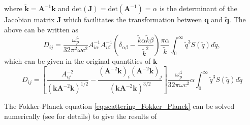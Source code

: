 where $\widetilde{\mathbf{k}} = \mathbf{A}^{-1} \mathbf{k}$ and $\mbox{det}(\mathbf{J}) =\mbox{det}(\mathbf{A}^{-1}) = \alpha$ is the determinant of the Jacobian matrix $\mathbf{J}$ which facilitates the transformation between $\mathbf{q}$ and $\widetilde{\mathbf{q}}$. The above can be written as
\begin{equation}
D_{ij} = \frac{\omega_p^4}{32 \pi^2 \omega c^2} A_{i\alpha}^{-1} A_{i \beta}^{-1} \left(\delta_{\alpha \beta} - \frac{\widetilde{k}\alpha \widetilde{k}\beta}{\widetilde{k}^2}\right) \frac{\pi \alpha}{\widetilde{k}} \int_0^\infty \widetilde{q}^3 S(\widetilde{q}) d\widetilde{q},
\end{equation}
which can be given in the original quantities of $\mathbf{k}$
\begin{equation}
D_{ij} = \left[ \frac{A_{ij}^{-2}}{(\mathbf{k}\mathbf{A}^{-2}\mathbf{k})^{1/2}} - \frac{(\mathbf{A}^{-2}\mathbf{k})_i (\mathbf{A}	^{-2}\mathbf{k})_j}{(\mathbf{k}\mathbf{A}^{-2}\mathbf{k})^{3/2}} \right] \frac{\omega_p^4}{32 \pi \omega c^2} \alpha \int_0^\infty \widetilde{q}^3 S(\widetilde{q}) d\widetilde{q}
\end{equation}

The Fokker-Planck equation \ref{eq:scattering_Fokker_Planck} can be solved numerically (see \cite{Kontar2019} for details) to give the results of \cite{Kontar2019}

%












































